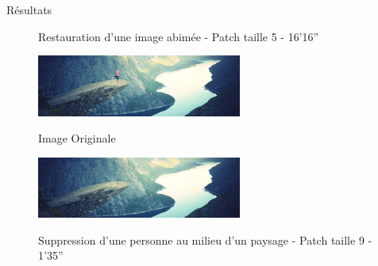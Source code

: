 \documentclass[final,hyperref={pdfpagelabels=false}]{beamer}
\begin{document}
\begin{frame}[t]
\begin{columns}[t]
\begin{column}{.465\textwidth}
\begin{block}{\Large Résultats}
\begin{figure}[H]
\centering
{}
\caption{Restauration d'une image abimée - Patch taille 5 - 16'16''}
\end{figure}
\begin{figure}[H]
\includegraphics[width=0.6\textwidth]{figures/trolltunga.jpg}\label{fig:troll}
\caption{Image Originale}
\end{figure}
\begin{figure}[H]
\includegraphics[width=0.6\textwidth]{figures/resultTroll9.png}\label{fig:trollb}
\caption{Suppression d'une personne au milieu d'un paysage - Patch taille 9 - 1'35''}
\end{figure}



\end{block}
\end{column}
\end{columns}
\end{frame}
\end{document}
